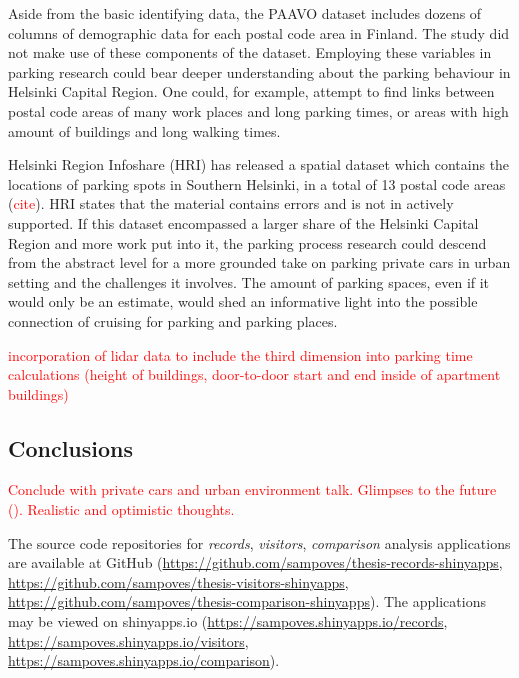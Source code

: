 Aside from the basic identifying data, the PAAVO dataset includes dozens of columns of demographic data for each postal code area in Finland. The study did not make use of these components of the dataset. Employing these variables in parking research could bear deeper understanding about the parking behaviour in Helsinki Capital Region. One could, for example, attempt to find links between postal code areas of many work places and long parking times, or areas with high amount of buildings and long walking times.

Helsinki Region Infoshare (HRI) has released a spatial dataset which contains the locations of parking spots in Southern Helsinki, in a total of 13 postal code areas (\textcolor{red}{cite}). HRI states that the material contains errors and is not in actively supported. If this dataset encompassed a larger share of the Helsinki Capital Region and more work put into it, the parking process research could descend from the abstract level for a more grounded take on parking private cars in urban setting and the challenges it involves. The amount of parking spaces, even if it would only be an estimate, would shed an informative light into the possible connection of cruising for parking and parking places.

\textcolor{red}{incorporation of lidar data to include the third dimension into parking time calculations (height of buildings, door-to-door start and end inside of apartment buildings)}

\newpage
\subsection{Conclusions}
\justify


\textcolor{red}{Conclude with private cars and urban environment talk. Glimpses to the future (\cite{ElinaBrandtMatleenaLindeqvist2016}). Realistic and optimistic thoughts.}

The source code repositories for \textit{records}, \textit{visitors}, \textit{comparison} analysis applications are available at GitHub (\textcolor{blue}{\url{https://github.com/sampoves/thesis-records-shinyapps}}, \textcolor{blue}{\url{https://github.com/sampoves/thesis-visitors-shinyapps}}, \textcolor{blue}{\url{https://github.com/sampoves/thesis-comparison-shinyapps}}). The applications may be viewed on shinyapps.io (\textcolor{blue}{\url{https://sampoves.shinyapps.io/records}}, \textcolor{blue}{\url{https://sampoves.shinyapps.io/visitors}}, \textcolor{blue}{\url{https://sampoves.shinyapps.io/comparison}}).